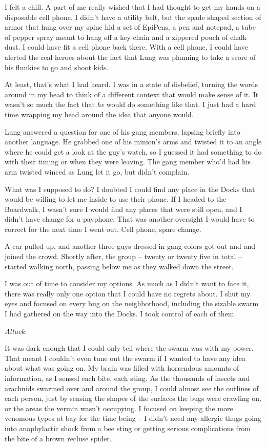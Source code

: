 I felt a chill. A part of me really wished that I had thought to get my hands on a disposable cell phone. I didn't have a utility belt, but the spade shaped section of armor that hung over my spine hid a set of EpiPens, a pen and notepad, a tube of pepper spray meant to hang off a key chain and a zippered pouch of chalk dust. I could have fit a cell phone back there. With a cell phone, I could have alerted the real heroes about the fact that Lung was planning to take a score of his flunkies to go and shoot kids.

At least, that's what I had heard. I was in a state of disbelief, turning the words around in my head to think of a different context that would make sense of it. It wasn't so much the fact that {\em he} would do something like that. I just had a hard time wrapping my head around the idea that anyone would.

Lung answered a question for one of his gang members, lapsing briefly into another language. He grabbed one of his minion's arms and twisted it to an angle where he could get a look at the guy's watch, so I guessed it had something to do with their timing or when they were leaving. The gang member who'd had his arm twisted winced as Lung let it go, but didn't complain.

What was I supposed to do? I doubted I could find any place in the Docks that would be willing to let me inside to use their phone. If I headed to the Boardwalk, I wasn't sure I would find any places that were still open, and I didn't have change for a payphone. That was another oversight I would have to correct for the next time I went out. Cell phone, spare change.

A car pulled up, and another three guys dressed in gang colors got out and and joined the crowd. Shortly after, the group -- twenty or twenty five in total -- started walking north, passing below me as they walked down the street.

I was out of time to consider my options. As much as I didn't want to face it, there was really only one option that I could have no regrets about. I shut my eyes and focused on every bug on the neighborhood, including the sizable swarm I had gathered on the way into the Docks. I took control of each of them.

{\em Attack.}

It was dark enough that I could only tell where the swarm was with my power. That meant I couldn't even tune out the swarm if I wanted to have any idea about what was going on. My brain was filled with horrendous amounts of information, as I sensed each bite, each sting. As the thousands of insects and arachnids swarmed over and around the group, I could almost see the outlines of each person, just by sensing the shapes of the surfaces the bugs were crawling on, or the areas the vermin wasn't occupying. I focused on keeping the more venomous types at bay for the time being -- I didn't need any allergic thugs going into anaphylactic shock from a bee sting or getting serious complications from the bite of a brown recluse spider.

